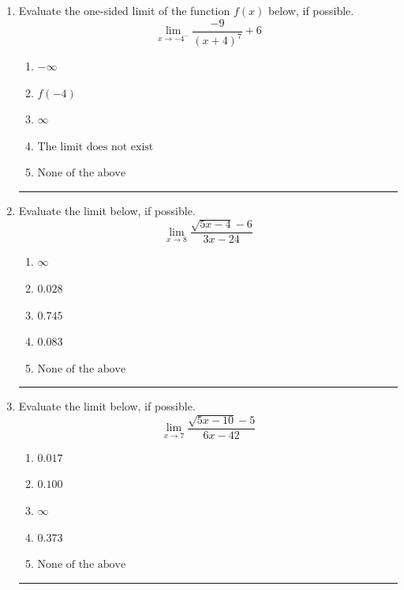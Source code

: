 \documentclass[14pt]{extbook}
\newcommand{\litem}[1]{\item#1\hspace*{-1cm}\rule{\textwidth}{0.4pt}}
\begin{document}
\begin{enumerate}
{\begin{enumerate}[label=\Alph*.]
\end{enumerate} }
\litem{
Evaluate the one-sided limit of the function $f(x)$ below, if possible.\[ \lim_{x \rightarrow -4^-} \frac{-9}{(x+4)^7}+6 \]\begin{enumerate}[label=\Alph*.]
\item \( -\infty \)
\item \( f(-4) \)
\item \( \infty \)
\item \( \text{The limit does not exist} \)
\item \( \text{None of the above} \)

\end{enumerate} }
\litem{
Evaluate the limit below, if possible.\[ \lim_{x \rightarrow 8} \frac{\sqrt{5x - 4} - 6}{3x - 24} \]\begin{enumerate}[label=\Alph*.]
\item \( \infty \)
\item \( 0.028 \)
\item \( 0.745 \)
\item \( 0.083 \)
\item \( \text{None of the above} \)

\end{enumerate} }
\litem{
Evaluate the limit below, if possible.\[ \lim_{x \rightarrow 7} \frac{\sqrt{5x - 10} - 5}{6x - 42} \]\begin{enumerate}[label=\Alph*.]
\item \( 0.017 \)
\item \( 0.100 \)
\item \( \infty \)
\item \( 0.373 \)
\item \( \text{None of the above} \)


\end{enumerate}}
\end{enumerate}
\end{document}
